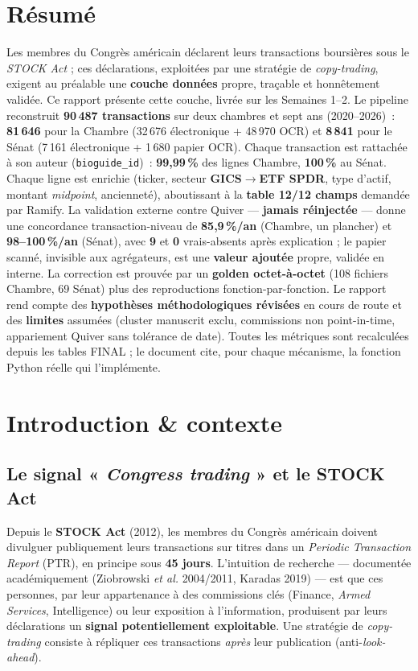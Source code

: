\documentclass[11pt,a4paper]{article}
\newcommand{\co}[1]{\texttt{\small #1}}
\begin{document}
\section*{Résumé}
Les membres du Congrès américain déclarent leurs transactions boursières sous le \emph{STOCK Act} ;
ces déclarations, exploitées par une stratégie de \emph{copy-trading}, exigent au préalable une
\textbf{couche données} propre, traçable et honnêtement validée. Ce rapport présente cette couche,
livrée sur les Semaines 1--2. Le pipeline reconstruit \textbf{90\,487 transactions} sur deux chambres
et sept ans (2020--2026)~: \textbf{81\,646} pour la Chambre (32\,676 électronique + 48\,970 OCR) et
\textbf{8\,841} pour le Sénat (7\,161 électronique + 1\,680 papier OCR). Chaque transaction est
rattachée à son auteur (\co{bioguide_id})~: \textbf{99,99\,\%} des lignes Chambre, \textbf{100\,\%}
au Sénat. Chaque ligne est enrichie (ticker, secteur \textbf{GICS}$\rightarrow$\textbf{ETF SPDR}, type
d'actif, montant \emph{midpoint}, ancienneté), aboutissant à la \textbf{table 12/12 champs} demandée par
Ramify. La validation externe contre Quiver — \textbf{jamais réinjectée} — donne une concordance
transaction-niveau de \textbf{85,9\,\%/an} (Chambre, un plancher) et \textbf{98--100\,\%/an} (Sénat),
avec \textbf{9} et \textbf{0} vrais-absents après explication ; le papier scanné, invisible aux
agrégateurs, est une \textbf{valeur ajoutée} propre, validée en interne. La correction est prouvée par
un \textbf{golden octet-à-octet} (108 fichiers Chambre, 69 Sénat) plus des reproductions
fonction-par-fonction. Le rapport rend compte des \textbf{hypothèses méthodologiques révisées} en cours
de route et des \textbf{limites} assumées (cluster manuscrit exclu, commissions non point-in-time,
appariement Quiver sans tolérance de date). Toutes les métriques sont recalculées depuis les tables
FINAL ; le document cite, pour chaque mécanisme, la fonction Python réelle qui l'implémente.

\bigskip
{\small\tableofcontents}
\clearpage

\section{Introduction \& contexte}

\subsection{Le signal « \emph{Congress trading} » et le STOCK Act}
Depuis le \textbf{STOCK Act} (2012), les membres du Congrès américain doivent divulguer publiquement
leurs transactions sur titres dans un \emph{Periodic Transaction Report} (PTR), en principe sous
\textbf{45 jours}. L'intuition de recherche — documentée académiquement (Ziobrowski \emph{et al.}
2004/2011, Karadas 2019) — est que ces personnes, par leur appartenance à des commissions clés
(Finance, \emph{Armed Services}, Intelligence) ou leur exposition à l'information, produisent par leurs
déclarations un \textbf{signal potentiellement exploitable}. Une stratégie de \emph{copy-trading}
consiste à répliquer ces transactions \emph{après} leur publication (anti-\emph{look-ahead}).
\end{document}
